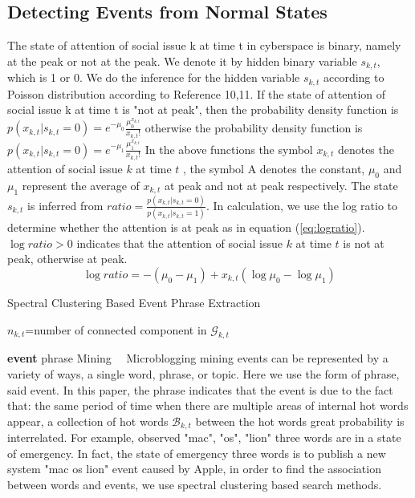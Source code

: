 \documentclass[11pt]{article}
\begin{document}
\subsection{Detecting Events from Normal States}
The state of attention of social issue k at time t in cyberspace is binary, namely at the peak or not at the peak. We denote it by hidden binary variable \(s_{k,t}\), which is 1 or 0. We do the inference for the hidden variable \(s_{k,t}\) according to Poisson distribution according to Reference\cite{Diao:2012wj} 10,11. If the state of attention of social issue k at time t is "not at peak", then the probability density function is 
\(p(x_{k,t}|s_{k,t}=0)=e^{-\mu_0 }  \frac{\mu_0^{x_{k,t}}}{x_{k,t}!}\) otherwise the probability density function is \(p(x_{k,t}|s_{k,t}=0)=e^{-\mu_1 }  \frac{\mu_1^{x_{k,t}}}{x_{k,t}!}\)
In the above functions the symbol \(x_{k,t}\) denotes the attention of social issue \(k\) at time \(t\) , the symbol A denotes the constant, \(\mu_0\) and \(\mu_1\) represent the average of \(x_{k,t}\) at peak and not at peak respectively. The state \(s_{k,t}\) is inferred from \(ratio=\frac{p(x_{k,t} |s_{k,t}=0)}{p(x_{k,t} |s_{k,t}=1)} \).
In calculation, we use the log ratio to determine whether the attention is at peak as in equation (\ref{eq:logratio}). \(\log ratio>0 \) indicates that the attention of social issue \(k\) at time \(t\) is not at peak, otherwise at peak. 
\begin{equation}
\label{eq:logratio}
\log ratio=-(\mu_0-\mu_1 )+x_{k,t}(\log \mu_0 -\log⁡ \mu_1)
\end{equation}

\begin{algorithm}
\label{alg:eventKeywordsSearchMethod}
\caption{Spectral Clustering Based Event Phrase Extraction}
\label{alg:eventKeywordsSearchMethod}
\(n_{k,t}\)=number of connected component in \(\mathcal{G}_{k,t}\)\\
\end{algorithm}


\textbf{event} phrase Mining
\ \ Microblogging mining events can be represented by a variety of ways, a single word, phrase, or topic.
Here we use the form of phrase, said event.
In this paper, the phrase indicates that the event is due to the fact that: the same period of time when there are multiple areas of internal hot words appear, a collection of hot words \(\mathcal{B}_{k, t} \) between the hot words great probability is interrelated. For example, observed "mac", "os", "lion" three words are in a state of emergency.
In fact, the state of emergency three words is to publish a new system "mac os lion" event caused by Apple, in order to find the association between words and events, we use spectral clustering based search methods.
\end{document}

